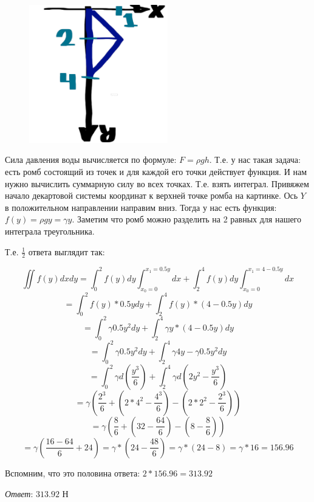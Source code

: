 \begin{minipage}{\linewidth}

    \begin{figure}
        \includegraphics[height=60mm]{images/1a2}
    \end{figure}

    Сила давления воды вычисляется по формуле: $F = \rho g h$. Т.е. у нас такая задача: есть ромб состоящий из точек и для каждой его точки
    действует функция. И нам нужно вычислить суммарную силу во всех точках. Т.е. взять интеграл. Привяжем начало декартовой системы координат к верхней точке ромба на картинке.
    Ось $Y$ в положительном направлении направим вниз. Тогда у нас есть функция: $f(y) = \rho g y = \gamma y$. Заметим что ромб можно разделить на 2 равных для нашего интеграла треугольника.

\end{minipage}

\vspace{14mm}

Т.е. $\frac{1}{2}$ ответа выглядит так:

\[\iint{f(y)}dxdy = \int_{0}^{2} f(y) dy \int_{x_0 = 0}^{x_1 = 0.5y} dx +
\int_{2}^{4} f(y) dy \int_{x_0 = 0}^{x_1 = 4-0.5y} dx\]
\[ = \int_{0}^{2} f(y)*0.5y dy + \int_{2}^{4} f(y) * (4-0.5y) dy\]
\[ = \int_{0}^{2} \gamma 0.5y^2 dy + \int_{2}^{4} \gamma y * (4 - 0.5y) dy\]
\[ = \int_{0}^{2} \gamma 0.5y^2 dy + \int_{2}^{4} \gamma 4 y - \gamma 0.5y^2 dy\]
\[ = \int_{0}^{2} \gamma d\left(\frac{y^3}{6}\right)  + \int_{2}^{4} \gamma d\left( 2 y^2 - \frac{y^3}{6} \right)\]
\[ = \gamma \left(\frac{2^3}{6} + \left( 2* 4^2 - \frac{4^3}{6} \right) - \left( 2* 2^2 - \frac{2^3}{6} \right) \right)\]
\[ = \gamma \left(\frac{8}{6} + \left( 32 - \frac{64}{6} \right) - \left( 8 - \frac{8}{6} \right) \right)\]
\[ = \gamma \left(\frac{16-64}{6} + 24 \right) = \gamma *\left( 24 - \frac{48}{6}\right) =  \gamma * (24 - 8) =  \gamma * 16 = 156.96\]

Вспомним, что это половина ответа: $2 * 156.96 = 313.92$

\textit{Ответ}: $313.92$ Н
\clearpage
